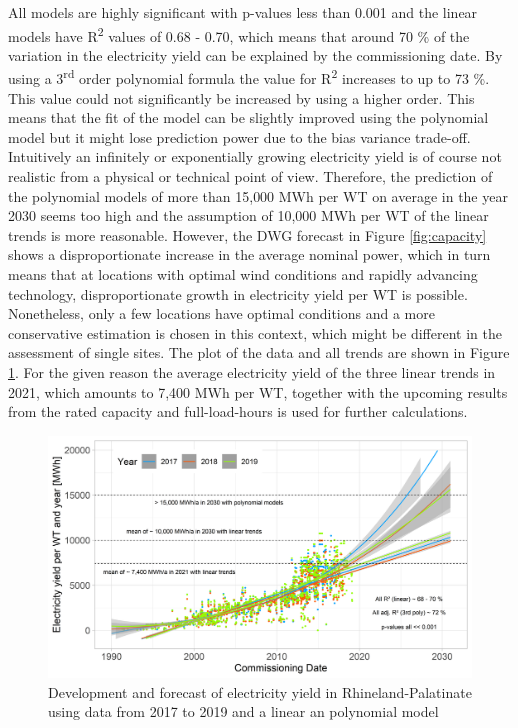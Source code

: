 \documentclass[a4paper,11pt]{article}
\begin{document}
All models are highly significant with p-values less than 0.001 and the linear models have R\textsuperscript{2} values of 0.68 - 0.70, which means that around 70 \% of the variation in the electricity yield can be explained by the commissioning date. By using a 3\textsuperscript{rd} order polynomial formula the value for R\textsuperscript{2} increases to up to 73 \%. This value could not significantly be increased by using a higher order. This means that the fit of the model can be slightly improved using the polynomial model but it might lose prediction power due to the bias variance trade-off. Intuitively an infinitely or exponentially growing electricity yield is of course not realistic from a physical or technical point of view. Therefore, the prediction of the polynomial models of more than 15,000 MWh per WT on average in the year 2030 seems too high and the assumption of 10,000 MWh per WT of the linear trends is more reasonable. However, the DWG forecast in Figure \ref{fig:capacity} shows a disproportionate increase in the average nominal power, which in turn means that at locations with optimal wind conditions and rapidly advancing technology, disproportionate growth in electricity yield per WT is possible. Nonetheless, only a few locations have optimal conditions and a more conservative estimation is chosen in this context, which might be different in the assessment of single sites. The plot of the data and all trends are shown in Figure \ref{fig:electricityyield}. For the given reason the average electricity yield of the three linear trends in 2021, which amounts to 7,400 MWh per WT, together with the upcoming results from the rated capacity and full-load-hours is used for further calculations.
\begin{figure}

{\centering \includegraphics[width=1\linewidth]{data/Amprion/results_of_analysis/electricity_yield_2017-2019} 

}

\caption{Development and forecast of electricity yield in Rhineland-Palatinate using data from 2017 to 2019 and a linear an polynomial model}\label{fig:electricityyield}
\end{figure}
\end{document}
